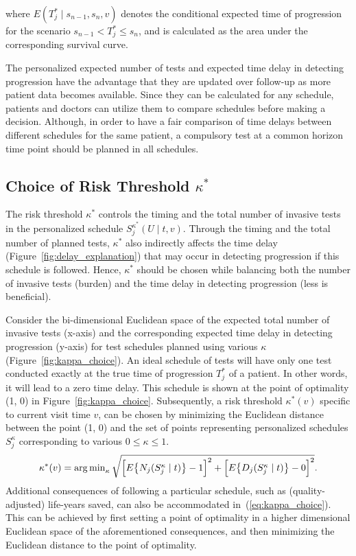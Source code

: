 where $E(T^*_j \mid s_{n-1}, s_n, v)$ denotes the conditional expected time of progression for the scenario $s_{n-1} < T^*_j \leq s_n$, and is calculated as the area under the corresponding survival curve.

The personalized expected number of tests and expected time delay in detecting progression have the advantage that they are updated over follow-up as more patient data becomes available. Since they can be calculated for any schedule, patients and doctors can utilize them to compare schedules before making a decision. Although, in order to have a fair comparison of time delays between different schedules for the same patient, a compulsory test at a common horizon time point should be planned in all schedules.

\subsection{Choice of Risk Threshold $\kappa^*$}
The risk threshold $\kappa^*$ controls the timing and the total number of invasive tests in the personalized schedule $S_j^{\kappa^*}(U \mid t, v)$. Through the timing and the total number of planned tests, $\kappa^*$ also indirectly affects the time delay (Figure~\ref{fig:delay_explanation}) that may occur in detecting progression if this schedule is followed. Hence, $\kappa^*$ should be chosen while balancing both the number of invasive tests (burden) and the time delay in detecting progression (less is beneficial).

Consider the bi-dimensional Euclidean space of the expected total number of invasive tests (x-axis) and the corresponding expected time delay in detecting progression (y-axis) for test schedules planned using various $\kappa$ (Figure~\ref{fig:kappa_choice}). An ideal schedule of tests will have only one test conducted exactly at the true time of progression $T^*_j$ of a patient. In other words, it will lead to a zero time delay. This schedule is shown at the point of optimality (1, 0) in Figure~\ref{fig:kappa_choice}. Subsequently, a risk threshold $\kappa^*(v)$ specific to current visit time $v$, can be chosen by minimizing the Euclidean distance between the point (1, 0) and the set of points representing personalized schedules $S_j^{\kappa}$ corresponding to various $0 \leq \kappa \leq 1$.
\begin{equation}
\label{eq:kappa_choice}
\kappa^*(v) = \argmin_{\kappa} \sqrt{\Big[E\big\{N_j(S_j^{\kappa} \mid t)\big\} - 1\Big]^2 + \Big[E\big\{D_j(S_j^{\kappa} \mid t)\big\} - 0\Big]^2}.
\end{equation}
Additional consequences of following a particular schedule, such as (quality-adjusted) life-years saved, can also be accommodated in~(\ref{eq:kappa_choice}). This can be achieved by first setting a point of optimality in a higher dimensional Euclidean space of the aforementioned consequences, and then minimizing the Euclidean distance to the point of optimality.

